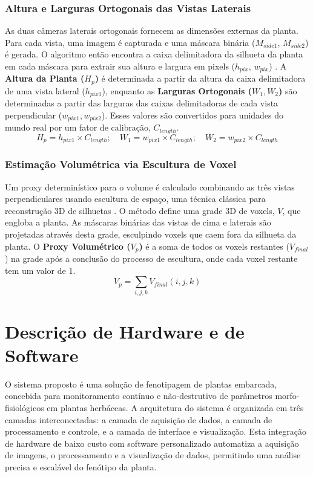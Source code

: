 \documentclass[12pt, a4paper]{article}
\begin{document}
	
	\subsubsection{Altura e Larguras Ortogonais das Vistas Laterais}
	As duas câmeras laterais ortogonais fornecem as dimensões externas da planta. Para cada vista, uma imagem é capturada e uma máscara binária ($M_{side1}$, $M_{side2}$) é gerada. O algoritmo então encontra a caixa delimitadora da silhueta da planta em cada máscara para extrair sua altura e largura em pixels ($h_{pix}$, $w_{pix}$) \cite{Hartmann2011}. A \textbf{Altura da Planta ($H_p$)} é determinada a partir da altura da caixa delimitadora de uma vista lateral ($h_{pix1}$), enquanto as \textbf{Larguras Ortogonais ($W_1, W_2$)} são determinadas a partir das larguras das caixas delimitadoras de cada vista perpendicular ($w_{pix1}, w_{pix2}$). Esses valores são convertidos para unidades do mundo real por um fator de calibração, $C_{length}$.
	\begin{equation}
		H_p = h_{pix1} \times C_{length}; \quad W_1 = w_{pix1} \times C_{length}; \quad W_2 = w_{pix2} \times C_{length}
	\end{equation}
	
	\subsubsection{Estimação Volumétrica via Escultura de Voxel}
	Um proxy determinístico para o volume é calculado combinando as três vistas perpendiculares usando escultura de espaço, uma técnica clássica para reconstrução 3D de silhuetas \cite{Pound2014}. O método define uma grade 3D de voxels, $V$, que engloba a planta. As máscaras binárias das vistas de cima e laterais são projetadas através desta grade, esculpindo voxels que caem fora da silhueta da planta. O \textbf{Proxy Volumétrico ($V_p$)} é a soma de todos os voxels restantes ($V_{final}$) na grade após a conclusão do processo de escultura, onde cada voxel restante tem um valor de 1.
	\begin{equation}
		V_p = \sum_{i,j,k} V_{final}(i,j,k)
	\end{equation}
	
	\section{Descrição de Hardware e de Software}
	O sistema proposto é uma solução de fenotipagem de plantas embarcada, concebida para monitoramento contínuo e não-destrutivo de parâmetros morfo-fisiológicos em plantas herbáceas. A arquitetura do sistema é organizada em três camadas interconectadas: a camada de aquisição de dados, a camada de processamento e controle, e a camada de interface e visualização. Esta integração de hardware de baixo custo com software personalizado automatiza a aquisição de imagens, o processamento e a visualização de dados, permitindo uma análise precisa e escalável do fenótipo da planta.
	
\end{document}
